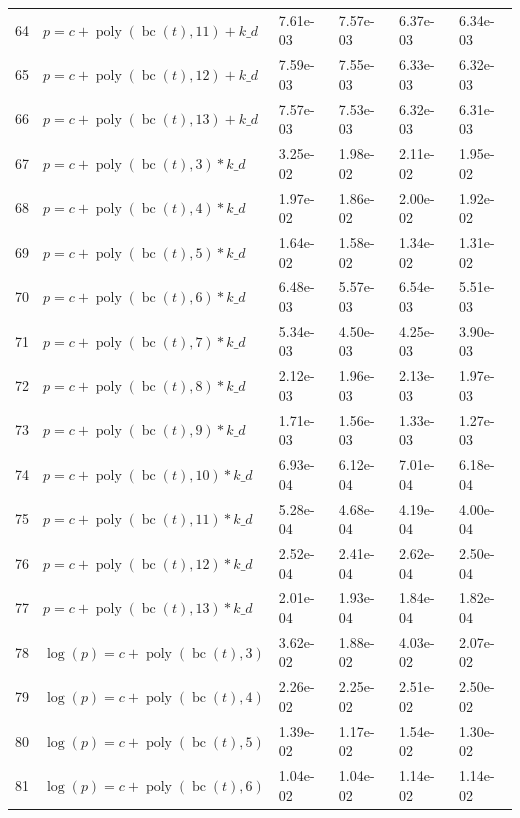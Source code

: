 \documentclass[12pt,a4paper]{article}
\DeclareMathOperator{\bc}{bc}
\DeclareMathOperator{\poly}{poly}
\begin{document}
\begin{longtable}[t]{ll>{\raggedleft\arraybackslash}p{2cm}>{\raggedleft\arraybackslash}p{2cm}>{\raggedleft\arraybackslash}p{2cm}>{\raggedleft\arraybackslash}p{2cm}}
64 & $p = c + \poly\left( \bc(t), 11 \right) + k\_d$ & 7.61e-03 & 7.57e-03 & 6.37e-03 & 6.34e-03\\
\rowcolor{gray!6}  65 & $p = c + \poly\left( \bc(t), 12 \right) + k\_d$ & 7.59e-03 & 7.55e-03 & 6.33e-03 & 6.32e-03\\
66 & $p = c + \poly\left( \bc(t), 13 \right) + k\_d$ & 7.57e-03 & 7.53e-03 & 6.32e-03 & 6.31e-03\\
\rowcolor{gray!6}  67 & $p = c + \poly\left( \bc(t), 3 \right) * k\_d$ & 3.25e-02 & 1.98e-02 & 2.11e-02 & 1.95e-02\\
68 & $p = c + \poly\left( \bc(t), 4 \right) * k\_d$ & 1.97e-02 & 1.86e-02 & 2.00e-02 & 1.92e-02\\
\rowcolor{gray!6}  69 & $p = c + \poly\left( \bc(t), 5 \right) * k\_d$ & 1.64e-02 & 1.58e-02 & 1.34e-02 & 1.31e-02\\
70 & $p = c + \poly\left( \bc(t), 6 \right) * k\_d$ & 6.48e-03 & 5.57e-03 & 6.54e-03 & 5.51e-03\\
\rowcolor{gray!6}  71 & $p = c + \poly\left( \bc(t), 7 \right) * k\_d$ & 5.34e-03 & 4.50e-03 & 4.25e-03 & 3.90e-03\\
72 & $p = c + \poly\left( \bc(t), 8 \right) * k\_d$ & 2.12e-03 & 1.96e-03 & 2.13e-03 & 1.97e-03\\
\rowcolor{gray!6}  73 & $p = c + \poly\left( \bc(t), 9 \right) * k\_d$ & 1.71e-03 & 1.56e-03 & 1.33e-03 & 1.27e-03\\
74 & $p = c + \poly\left( \bc(t), 10 \right) * k\_d$ & 6.93e-04 & 6.12e-04 & 7.01e-04 & 6.18e-04\\
\rowcolor{gray!6}  75 & $p = c + \poly\left( \bc(t), 11 \right) * k\_d$ & 5.28e-04 & 4.68e-04 & 4.19e-04 & 4.00e-04\\
76 & $p = c + \poly\left( \bc(t), 12 \right) * k\_d$ & 2.52e-04 & 2.41e-04 & 2.62e-04 & 2.50e-04\\
\rowcolor{gray!6}  77 & $p = c + \poly\left( \bc(t), 13 \right) * k\_d$ & 2.01e-04 & 1.93e-04 & 1.84e-04 & 1.82e-04\\
78 & $\log(p) = c + \poly\left( \bc(t), 3 \right)$ & 3.62e-02 & 1.88e-02 & 4.03e-02 & 2.07e-02\\
\rowcolor{gray!6}  79 & $\log(p) = c + \poly\left( \bc(t), 4 \right)$ & 2.26e-02 & 2.25e-02 & 2.51e-02 & 2.50e-02\\
80 & $\log(p) = c + \poly\left( \bc(t), 5 \right)$ & 1.39e-02 & 1.17e-02 & 1.54e-02 & 1.30e-02\\
\rowcolor{gray!6}  81 & $\log(p) = c + \poly\left( \bc(t), 6 \right)$ & 1.04e-02 & 1.04e-02 & 1.14e-02 & 1.14e-02\\

\end{longtable}
\end{document}
